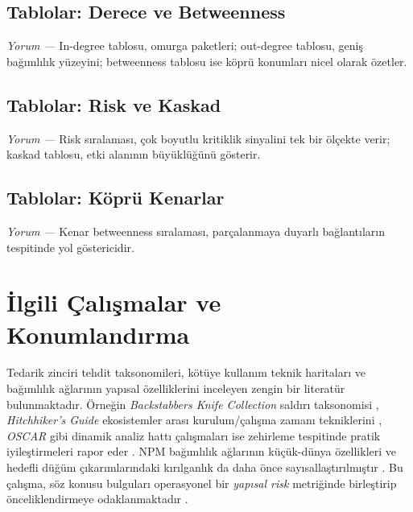 \documentclass[11pt,a4paper]{article}
\begin{document}
\subsection{Tablolar: Derece ve Betweenness}
\noindent\textit{Yorum —} In-degree tablosu, omurga paketleri; out-degree tablosu, geniş bağımlılık yüzeyini; betweenness tablosu ise köprü konumları nicel olarak özetler.

\subsection{Tablolar: Risk ve Kaskad}
\noindent\textit{Yorum —} Risk sıralaması, çok boyutlu kritiklik sinyalini tek bir ölçekte verir; kaskad tablosu, etki alanının büyüklüğünü gösterir.

\subsection{Tablolar: Köprü Kenarlar}
\noindent\textit{Yorum —} Kenar betweenness sıralaması, parçalanmaya duyarlı bağlantıların tespitinde yol göstericidir.

\section{İlgili Çalışmalar ve Konumlandırma}
Tedarik zinciri tehdit taksonomileri, kötüye kullanım teknik haritaları ve bağımlılık ağlarının yapısal özelliklerini inceleyen zengin bir literatür bulunmaktadır. Örneğin \emph{Backstabbers Knife Collection} saldırı taksonomisi \cite{backstabbers2019}, \emph{Hitchhiker’s Guide} ekosistemler arası kurulum/çalışma zamanı tekniklerini \cite{hitchhikers2020}, \emph{OSCAR} gibi dinamik analiz hattı çalışmaları ise zehirleme tespitinde pratik iyileştirmeleri rapor eder \cite{oscar2023}. NPM bağımlılık ağlarının küçük-dünya özellikleri ve hedefli düğüm çıkarımlarındaki kırılganlık da daha önce sayısallaştırılmıştır \cite{npm_robustness,web_of_dependencies,demystifying}. Bu çalışma, söz konusu bulguları operasyonel bir \emph{yapısal risk} metriğinde birleştirip önceliklendirmeye odaklanmaktadır \cite{practical_malicious,supply_chain_attacks}.
\end{document}
